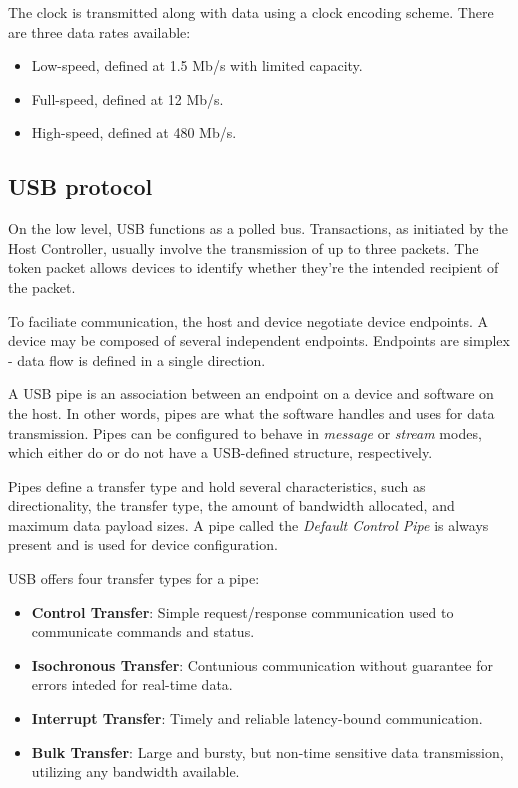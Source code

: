             The clock is transmitted along with data using a clock encoding scheme.  There are three data rates available:
            \begin{itemize}
                \item Low-speed, defined at 1.5 Mb/s with limited capacity.
                \item Full-speed, defined at 12 Mb/s.
                \item High-speed, defined at 480 Mb/s.
            \end{itemize}
        
        \subsection{USB protocol}
            On the low level, USB functions as a polled bus.  Transactions, as initiated by the Host Controller, usually involve the transmission of up to three packets.  The token packet allows devices to identify whether they're the intended recipient of the packet.
            
            To faciliate communication, the host and device negotiate device endpoints.  A device may be composed of several independent endpoints.  Endpoints are simplex - data flow is defined in a single direction.
            
            A USB pipe is an association between an endpoint on a device and software on the host.  In other words, pipes are what the software handles and uses for data transmission.  Pipes can be configured to behave in \emph{message} or \emph{stream} modes, which either do or do not have a USB-defined structure, respectively.
            
            Pipes define a transfer type and hold several characteristics, such as directionality, the transfer type, the amount of bandwidth allocated, and maximum data payload sizes.  A pipe called the \emph{Default Control Pipe} is always present and is used for device configuration.
            
            
            USB offers four transfer types for a pipe:
            \begin{itemize}
                \item \textbf{Control Transfer}: Simple request/response communication used to communicate commands and status.
                \item \textbf{Isochronous Transfer}: Contunious communication without guarantee for errors inteded for real-time data.
                \item \textbf{Interrupt Transfer}: Timely and reliable latency-bound communication.
                \item \textbf{Bulk Transfer}: Large and bursty, but non-time sensitive data transmission, utilizing any bandwidth available.
            \end{itemize}
            
